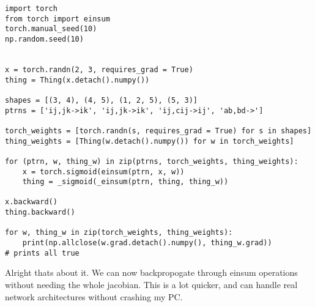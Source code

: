 \documentclass[11pt]{article}
\begin{document}
\begin{verbatim}
import torch
from torch import einsum
torch.manual_seed(10)
np.random.seed(10)


x = torch.randn(2, 3, requires_grad = True)
thing = Thing(x.detach().numpy())

shapes = [(3, 4), (4, 5), (1, 2, 5), (5, 3)]
ptrns = ['ij,jk->ik', 'ij,jk->ik', 'ij,cij->ij', 'ab,bd->']

torch_weights = [torch.randn(s, requires_grad = True) for s in shapes]
thing_weights = [Thing(w.detach().numpy()) for w in torch_weights]

for (ptrn, w, thing_w) in zip(ptrns, torch_weights, thing_weights):
    x = torch.sigmoid(einsum(ptrn, x, w))
    thing = _sigmoid(_einsum(ptrn, thing, thing_w))

x.backward()
thing.backward()

for w, thing_w in zip(torch_weights, thing_weights):
    print(np.allclose(w.grad.detach().numpy(), thing_w.grad))
# prints all true
\end{verbatim}

Alright thats about it. We can now backpropogate through einsum operations without needing the
whole jacobian. This is a lot quicker, and can handle real network architectures without crashing
my PC. 
\end{document}
